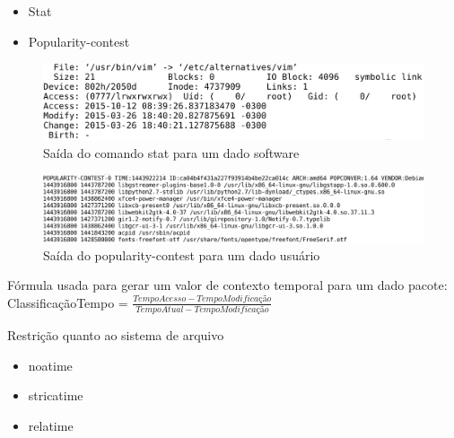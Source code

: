 \begin{frame}

    \begin{itemize}
        \item Stat
        \item Popularity-contest
    \end{itemize}

\end{frame}

\begin{frame}
\begin{figure}[h!]
    \centering
    \includegraphics[width=1\textwidth]{figura/comando_stat.eps}
    \caption{Saída do comando stat para um dado software}
\end{figure}
\end{frame}


\begin{frame}
\begin{figure}[h!]
    \centering
    \includegraphics[width=1\textwidth]{figura/popularity_contest.eps}
    \caption{Saída do popularity-contest para um dado usuário}
\end{figure}
\end{frame}


\begin{frame}

Fórmula usada para gerar um valor de contexto temporal para um dado pacote:
\newline
\newline
ClassificaçãoTempo = $\frac{TempoAcesso - TempoModificação}{TempoAtual -
TempoModificação}$

\end{frame}


\begin{frame}
    Restrição quanto ao sistema de arquivo

    \begin{itemize}
        \item noatime
        \item stricatime
        \item relatime
    \end{itemize}
\end{frame}

